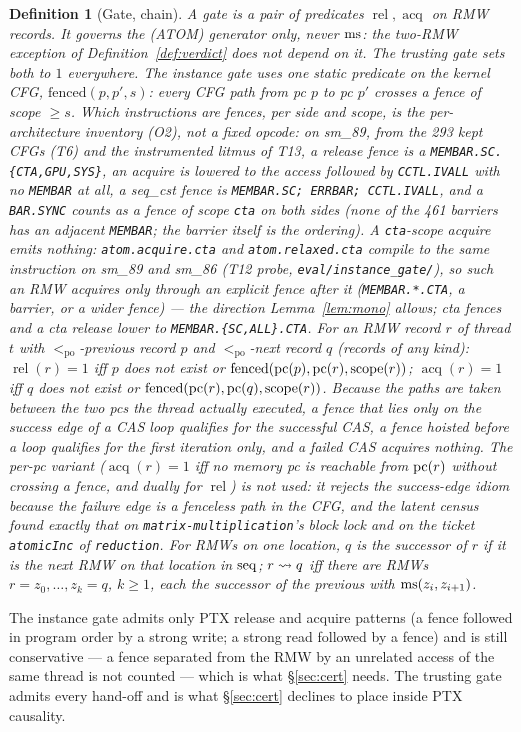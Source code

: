 \documentclass[11pt]{article}
\newtheorem{definition}[theorem]{Definition}
\theoremstyle{remark}
\DeclareMathOperator{\rel}{rel}\DeclareMathOperator{\acq}{acq}\DeclareMathOperator{\key}{key}
\newcommand{\PO}{<_{\mathrm{po}}}\newcommand{\HB}{\to_{\mathrm{hb}}}\newcommand{\HBr}{\trianglelefteq_{\mathrm{hb}}}
\begin{document}
\begin{definition}[Gate, chain]\label{def:gate}
A \emph{gate} is a pair of predicates $\rel,\acq$ on RMW records. It governs the (ATOM)
generator only, never $\operatorname{ms}$: the two-RMW exception of Definition~\ref{def:verdict} does
not depend on it. The \emph{trusting} gate sets both to $1$ everywhere. The
\emph{instance} gate uses one static predicate on the kernel CFG,
$\mathrm{fenced}(p,p',s)$: every CFG path from pc $p$ to pc $p'$ crosses a fence of
scope $\ge s$. Which instructions are fences, per side and scope, is the per-architecture
inventory (O2), not a fixed opcode: on sm\_89, from the 293 kept CFGs (T6) and the
instrumented litmus of T13, a release fence is a \texttt{MEMBAR.SC.\{CTA,GPU,SYS\}}, an
acquire is lowered to the access followed by \texttt{CCTL.IVALL} with no \texttt{MEMBAR}
at all, a seq\_cst fence is \texttt{MEMBAR.SC; ERRBAR; CCTL.IVALL}, and a \texttt{BAR.SYNC}
counts as a fence of scope \texttt{cta} on both sides (none of the 461 barriers has an
adjacent \texttt{MEMBAR}; the barrier itself is the ordering). A \texttt{cta}-scope
acquire emits nothing: \texttt{atom.acquire.cta} and \texttt{atom.relaxed.cta} compile to the
same instruction on sm\_89 and sm\_86 (T12 probe, \texttt{eval/instance\_gate/}), so such an
RMW acquires only through an explicit fence after it (\texttt{MEMBAR.*.CTA}, a barrier, or a
wider fence) --- the direction Lemma~\ref{lem:mono} allows; cta fences and a cta release lower
to \texttt{MEMBAR.\{SC,ALL\}.CTA}. For an RMW record $r$ of thread $t$ with $\PO$-previous record $p$
and $\PO$-next record $q$ (records of any kind): $\rel(r)=1$ iff $p$ does not exist or
$\mathrm{fenced}(\operatorname{pc}(p),\operatorname{pc}(r),\operatorname{scope}(r))$; $\acq(r)=1$ iff $q$ does not exist or
$\mathrm{fenced}(\operatorname{pc}(r),\operatorname{pc}(q),\operatorname{scope}(r))$. Because the paths are taken between the two
pcs the thread actually executed, a fence that lies only on the success edge of a CAS
loop qualifies for the successful CAS, a fence hoisted before a loop qualifies for the
first iteration only, and a failed CAS acquires nothing. The per-pc variant ($\acq(r)=1$
iff no memory pc is reachable from $\operatorname{pc}(r)$ without crossing a fence, and dually for
$\rel$) is \emph{not} used: it rejects the success-edge idiom because the failure edge is
a fenceless path in the CFG, and the latent census found exactly that on
\texttt{matrix-multiplication}'s block lock and on the ticket \texttt{atomicInc} of
\texttt{reduction}. For RMWs on one location, $q$ is the \emph{successor} of $r$ if it is
the next RMW on that location in $\operatorname{seq}$; $r\rightsquigarrow q$ iff there are RMWs
$r=z_0,\dots,z_k=q$, $k\ge1$, each the successor of the previous with
$\operatorname{ms}(z_i,z_{i+1})$.
\end{definition}
The instance gate admits only PTX release and acquire patterns (a fence followed in
program order by a strong write; a strong read followed by a fence) and is still
conservative --- a fence separated from the RMW by an unrelated access of the same thread
is not counted --- which is what \S\ref{sec:cert} needs. The trusting gate admits every
hand-off and is what \S\ref{sec:cert} declines to place inside PTX causality.
\end{document}
